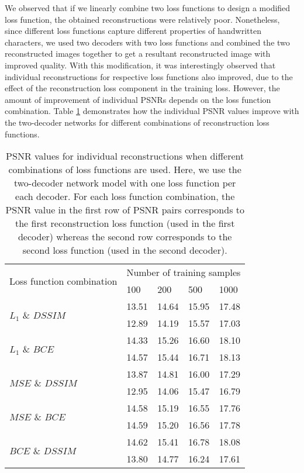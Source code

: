 We observed that if we linearly combine two loss functions to design a modified loss function, the obtained reconstructions were relatively poor. Nonetheless, since different loss functions capture different properties of handwritten characters, we used two decoders with two loss functions and combined the two reconstructed images together to get a resultant reconstructed image with improved quality. With this modification, it was interestingly observed that individual reconstructions for respective loss functions also improved, due to the effect of the reconstruction loss component in the training loss. However, the amount of improvement of individual PSNRs depends on the loss function combination. Table \ref{table3} demonstrates how the individual PSNR values improve with the two-decoder networks for different combinations of reconstruction loss functions.


\begin{table}[h!]
\caption{PSNR values for individual reconstructions when different combinations of loss functions are used. Here, we use the two-decoder network model with one loss function per each decoder. For each loss function combination, the PSNR value in the first row of PSNR pairs corresponds to the first reconstruction loss function (used in the first decoder) whereas the second row corresponds to the second loss function (used in the second decoder).}
\label{table3}
\centering
\footnotesize
\begin{tabular}{| p{1.9cm} | p{1cm} | p{1cm} | p{1cm} | p{1cm} |} 
 \hline
 \multirow{2}{8em}{Loss function combination} & \multicolumn{4}{c|}{Number of training samples}\\
 \cline{2-5}
 										& 100 		& 200 		& 500 		& 1000 \\ [0.5ex] 
 \hline\hline
 \multirow{2}{4em}{$L_1$  \&  $DSSIM$} 	& 13.51 	& 14.64 	& 15.95		& 17.48  	\\ 
 										& 12.89		& 14.19 	& 15.57		& 17.03	 \\
 \hline
 \multirow{2}{4em}{$L_1$  \&  $BCE$}	& 14.33		& 15.26 	& 16.60		& 18.10  	\\	
 										& 14.57		& 15.44		& 16.71		& 18.13	\\
 \hline
 \multirow{2}{4em}{$MSE$  \&  $DSSIM$}	& 13.87		& 14.81		& 16.00		& 17.29	\\
 										& 12.95		& 14.06		& 15.47		& 16.79 	\\
 \hline												
\multirow{2}{4em}{$MSE$  \&  $BCE$}		& 14.58		& 15.19 	& 16.55		& 17.76  \\
										& 14.59		& 15.20		& 16.56		& 17.78	\\
\hline
 \multirow{2}{4em}{$BCE$  \&  $DSSIM$} 	& 14.62		& 15.41 	& 16.78		& 18.08  \\
 										& 13.80		& 14.77 	& 16.24		& 17.61 \\ [1ex]
 \hline
\end{tabular}
\vspace{-3mm}
\end{table}


